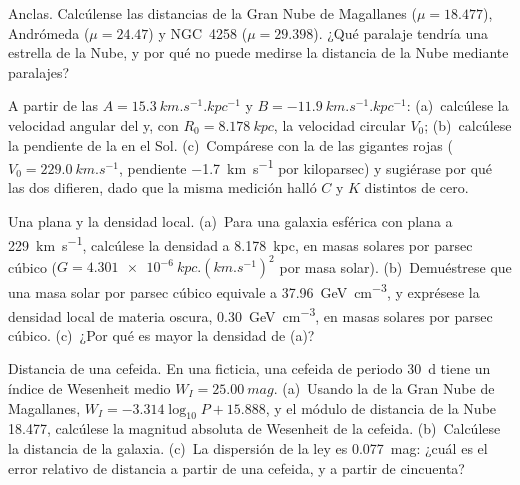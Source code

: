 \begin{exercise}[$\star$]\label{exo:b3:milky-way-galaxies:4}
Anclas. Calcúlense las distancias de la Gran Nube de Magallanes
($\mu = 18.477$), Andrómeda ($\mu = 24.47$) y NGC~4258
($\mu = 29.398$). ¿Qué paralaje tendría una estrella de la Nube, y por qué
no puede medirse la distancia de la Nube mediante paralajes?
\end{exercise}

\begin{exercise}[$\star\star$]\label{exo:b3:milky-way-galaxies:5}
A partir de las  $A = \qty{15.3}{km.s^{-1}.kpc^{-1}}$ y
$B = \qty{-11.9}{km.s^{-1}.kpc^{-1}}$: (a)~calcúlese la velocidad angular del
 y, con $R_0 = \qty{8.178}{kpc}$, la velocidad circular $V_0$;
(b)~calcúlese la pendiente de la  en el Sol. (c)~Compárese
con la  de las gigantes rojas ($V_0 = \qty{229.0}{km.s^{-1}}$,
pendiente \qty{-1.7}{km.s^{-1}} por kiloparsec) y sugiérase por qué las dos
difieren, dado que la misma medición halló $C$ y $K$ distintos de cero.
\end{exercise}

\begin{exercise}[$\star\star$]\label{exo:b3:milky-way-galaxies:6}
Una  plana y la densidad local. (a)~Para una galaxia esférica
con  plana a \qty{229}{km.s^{-1}}, calcúlese la densidad a
\qty{8.178}{kpc}, en masas solares por parsec cúbico
($G = \qty{4.301e-6}{kpc.(km.s^{-1})^2}$ por masa solar). (b)~Demuéstrese que
una masa solar por parsec cúbico equivale a \qty{37.96}{GeV.cm^{-3}}, y exprésese
la densidad local de materia oscura, \qty{0.30}{GeV.cm^{-3}}, en masas solares
por parsec cúbico. (c)~¿Por qué es mayor la densidad de (a)?
\end{exercise}

\begin{exercise}[$\star\star$]\label{exo:b3:milky-way-galaxies:7}
Distancia de una cefeida. En una  ficticia, una cefeida de periodo
\qty{30}{d} tiene un índice de Wesenheit medio $W_I = \qty{25.00}{mag}$.
(a)~Usando la  de la Gran Nube de Magallanes,
$W_I = -3.314\log_{10}P + 15.888$, y el módulo de distancia de la Nube
18.477, calcúlese la magnitud absoluta de Wesenheit de la cefeida. (b)~Calcúlese
la distancia de la galaxia. (c)~La dispersión de la ley es \qty{0.077}{mag}: ¿cuál es
el error relativo de distancia a partir de una cefeida, y a partir de cincuenta?
\end{exercise}

